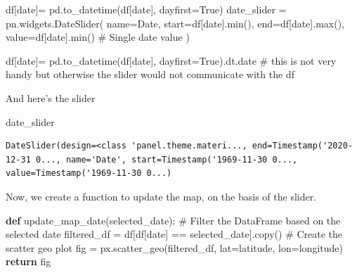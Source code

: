 \documentclass[
  letterpaper,
  DIV=11,
  numbers=noendperiod]{scrreprt}
\newenvironment{Shaded}{\begin{snugshade}}{\end{snugshade}}
\newcommand{\BuiltInTok}[1]{\textcolor[rgb]{0.00,0.23,0.31}{#1}}
\newcommand{\CommentTok}[1]{\textcolor[rgb]{0.37,0.37,0.37}{#1}}
\newcommand{\ControlFlowTok}[1]{\textcolor[rgb]{0.00,0.23,0.31}{\textbf{#1}}}
\newcommand{\KeywordTok}[1]{\textcolor[rgb]{0.00,0.23,0.31}{\textbf{#1}}}
\newcommand{\NormalTok}[1]{\textcolor[rgb]{0.00,0.23,0.31}{#1}}
\newcommand{\OperatorTok}[1]{\textcolor[rgb]{0.37,0.37,0.37}{#1}}
\newcommand{\StringTok}[1]{\textcolor[rgb]{0.13,0.47,0.30}{#1}}
\newcommand{\VariableTok}[1]{\textcolor[rgb]{0.07,0.07,0.07}{#1}}
\begin{document}
\begin{Shaded}
\begin{Highlighting}[]
\NormalTok{df[}\StringTok{\textquotesingle{}date\textquotesingle{}}\NormalTok{]}\OperatorTok{=}\NormalTok{ pd.to\_datetime(df[}\StringTok{\textquotesingle{}date\textquotesingle{}}\NormalTok{], dayfirst}\OperatorTok{=}\VariableTok{True}\NormalTok{)}
\NormalTok{date\_slider }\OperatorTok{=}\NormalTok{ pn.widgets.DateSlider(}
\NormalTok{    name}\OperatorTok{=}\StringTok{\textquotesingle{}Date\textquotesingle{}}\NormalTok{,}
\NormalTok{    start}\OperatorTok{=}\NormalTok{df[}\StringTok{\textquotesingle{}date\textquotesingle{}}\NormalTok{].}\BuiltInTok{min}\NormalTok{(),}
\NormalTok{    end}\OperatorTok{=}\NormalTok{df[}\StringTok{\textquotesingle{}date\textquotesingle{}}\NormalTok{].}\BuiltInTok{max}\NormalTok{(),}
\NormalTok{    value}\OperatorTok{=}\NormalTok{df[}\StringTok{\textquotesingle{}date\textquotesingle{}}\NormalTok{].}\BuiltInTok{min}\NormalTok{()  }\CommentTok{\# Single date value}
\NormalTok{)}

\NormalTok{df[}\StringTok{\textquotesingle{}date\textquotesingle{}}\NormalTok{]}\OperatorTok{=}\NormalTok{ pd.to\_datetime(df[}\StringTok{\textquotesingle{}date\textquotesingle{}}\NormalTok{], dayfirst}\OperatorTok{=}\VariableTok{True}\NormalTok{).dt.date }\CommentTok{\# this is not very handy but otherwise the slider would not communicate with the df}
\end{Highlighting}
\end{Shaded}

And here's the slider

\begin{Shaded}
\begin{Highlighting}[]
\NormalTok{date\_slider}
\end{Highlighting}
\end{Shaded}

\begin{verbatim}
DateSlider(design=<class 'panel.theme.materi..., end=Timestamp('2020-12-31 0..., name='Date', start=Timestamp('1969-11-30 0..., value=Timestamp('1969-11-30 0...)
\end{verbatim}

Now, we create a function to update the map, on the basis of the slider.

\begin{Shaded}
\begin{Highlighting}[]
\KeywordTok{def}\NormalTok{ update\_map\_date(selected\_date):}
    \CommentTok{\# Filter the DataFrame based on the selected date}
\NormalTok{    filtered\_df }\OperatorTok{=}\NormalTok{ df[df[}\StringTok{\textquotesingle{}date\textquotesingle{}}\NormalTok{] }\OperatorTok{==}\NormalTok{ selected\_date].copy()}
    \CommentTok{\# Create the scatter geo plot}
\NormalTok{    fig }\OperatorTok{=}\NormalTok{ px.scatter\_geo(filtered\_df, lat}\OperatorTok{=}\StringTok{\textquotesingle{}latitude\textquotesingle{}}\NormalTok{, lon}\OperatorTok{=}\StringTok{\textquotesingle{}longitude\textquotesingle{}}\NormalTok{)}
    \ControlFlowTok{return}\NormalTok{ fig}
\end{Highlighting}
\end{Shaded}
\end{document}
